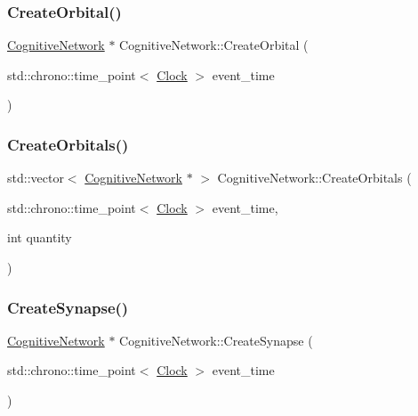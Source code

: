 \mbox{\label{classCognitiveNetwork_a5e0a782afc45d75d57fef91dd5513546}} 
\subsubsection{\texorpdfstring{Create\+Orbital()}{CreateOrbital()}}
{\footnotesize\ttfamily \mbox{\hyperlink{classCognitiveNetwork}{Cognitive\+Network}} $\ast$ Cognitive\+Network\+::\+Create\+Orbital (\begin{DoxyParamCaption}\item[{std\+::chrono\+::time\+\_\+point$<$ \mbox{\hyperlink{universe_8h_a0ef8d951d1ca5ab3cfaf7ab4c7a6fd80}{Clock}} $>$}]{event\+\_\+time }\end{DoxyParamCaption})}

\mbox{\label{classCognitiveNetwork_a46d4189cf3e6b9af6190abe7b79539b4}} 
\subsubsection{\texorpdfstring{Create\+Orbitals()}{CreateOrbitals()}}
{\footnotesize\ttfamily std\+::vector$<$ \mbox{\hyperlink{classCognitiveNetwork}{Cognitive\+Network}} $\ast$ $>$ Cognitive\+Network\+::\+Create\+Orbitals (\begin{DoxyParamCaption}\item[{std\+::chrono\+::time\+\_\+point$<$ \mbox{\hyperlink{universe_8h_a0ef8d951d1ca5ab3cfaf7ab4c7a6fd80}{Clock}} $>$}]{event\+\_\+time,  }\item[{int}]{quantity }\end{DoxyParamCaption})}

\mbox{\label{classCognitiveNetwork_ade8e9295b35790b136dca9084a1b7aa9}} 
\subsubsection{\texorpdfstring{Create\+Synapse()}{CreateSynapse()}}
{\footnotesize\ttfamily \mbox{\hyperlink{classCognitiveNetwork}{Cognitive\+Network}} $\ast$ Cognitive\+Network\+::\+Create\+Synapse (\begin{DoxyParamCaption}\item[{std\+::chrono\+::time\+\_\+point$<$ \mbox{\hyperlink{universe_8h_a0ef8d951d1ca5ab3cfaf7ab4c7a6fd80}{Clock}} $>$}]{event\+\_\+time }\end{DoxyParamCaption})}

